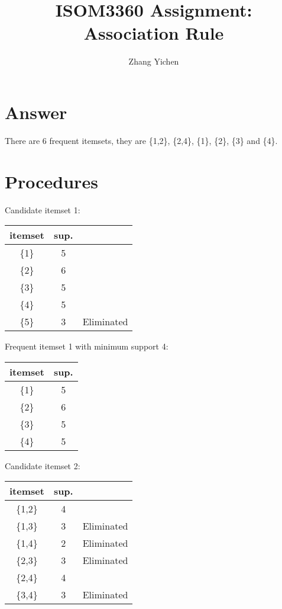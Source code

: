 \documentclass{article}
\title{ISOM3360 Assignment: Association Rule}
\author{Zhang Yichen}
\begin{document}
\maketitle

\section{Answer} 
There are 6 frequent itemsets, they are \{1,2\}, \{2,4\}, \{1\}, \{2\}, \{3\} and \{4\}.

\section{Procedures}
Candidate itemset 1:
\begin{center}
    \begin{tabular}{| c | c | c |}
        \hline
        itemset & sup. & \\ 
        \hline
        \{1\} & 5 &\\  
        \hline
        \{2\} & 6 &\\  
        \hline
        \{3\} & 5 &\\  
        \hline
        \{4\} & 5 &\\  
        \hline
        \{5\} & 3 & Eliminated\\  
        \hline
    \end{tabular}
\end{center}

Frequent itemset 1 with minimum support 4:
\begin{center}
    \begin{tabular}{| c | c |}
        \hline
        itemset & sup.\\ 
        \hline
        \{1\} & 5\\  
        \hline
        \{2\} & 6\\  
        \hline
        \{3\} & 5\\  
        \hline
        \{4\} & 5\\  
        \hline
    \end{tabular}
\end{center}

Candidate itemset 2:
\begin{center}
    \begin{tabular}{| c | c | c |}
        \hline
        itemset & sup. & \\ 
        \hline
        \{1,2\} & 4 &\\  
        \hline
        \{1,3\} & 3 & Eliminated\\  
        \hline
        \{1,4\} & 2 & Eliminated\\  
        \hline
        \{2,3\} & 3 & Eliminated\\  
        \hline
        \{2,4\} & 4 &\\  
        \hline
        \{3,4\} & 3 & Eliminated\\  
        \hline
    \end{tabular}
\end{center}
\end{document}
